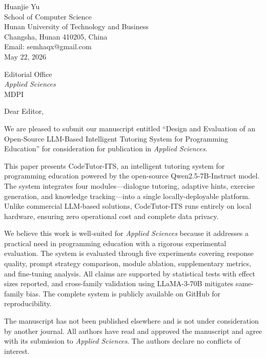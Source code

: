 \documentclass[11pt,a4paper]{article}
\begin{document}
\begin{flushright}
Huanjie Yu\\
School of Computer Science\\
Hunan University of Technology and Business\\
Changsha, Hunan 410205, China\\
Email: semhaqx@gmail.com\\[12pt]
May 22, 2026
\end{flushright}

\vspace{12pt}

\noindent Editorial Office\\
\textit{Applied Sciences}\\
MDPI

\vspace{12pt}

\noindent Dear Editor,

\vspace{6pt}

We are pleased to submit our manuscript entitled ``Design and Evaluation of an Open-Source LLM-Based Intelligent Tutoring System for Programming Education'' for consideration for publication in \textit{Applied Sciences}.

This paper presents CodeTutor-ITS, an intelligent tutoring system for programming education powered by the open-source Qwen2.5-7B-Instruct model. The system integrates four modules---dialogue tutoring, adaptive hints, exercise generation, and knowledge tracking---into a single locally-deployable platform. Unlike commercial LLM-based solutions, CodeTutor-ITS runs entirely on local hardware, ensuring zero operational cost and complete data privacy.

We believe this work is well-suited for \textit{Applied Sciences} because it addresses a practical need in programming education with a rigorous experimental evaluation. The system is evaluated through five experiments covering response quality, prompt strategy comparison, module ablation, supplementary metrics, and fine-tuning analysis. All claims are supported by statistical tests with effect sizes reported, and cross-family validation using LLaMA-3-70B mitigates same-family bias. The complete system is publicly available on GitHub for reproducibility.

The manuscript has not been published elsewhere and is not under consideration by another journal. All authors have read and approved the manuscript and agree with its submission to \textit{Applied Sciences}. The authors declare no conflicts of interest.
\end{document}
